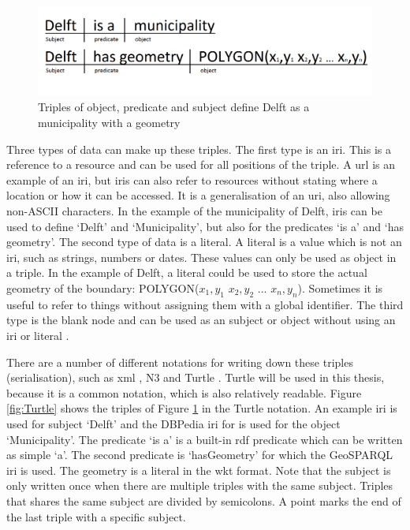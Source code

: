 \begin{figure}
	\includegraphics[width=0.7\linewidth]{figs/Triples.png}
	\caption{Triples of object, predicate and subject define Delft as a municipality with a geometry}
	\label{fig:Triples}
\end{figure}

Three types of data can make up these triples. The first type is an \ac{iri}. This is a reference to a resource and can be used for all positions of the triple. A \ac{url} is an example of an \ac{iri}, but \ac{iri}s can also refer to resources without stating where a location or how it can be accessed. It is a generalisation of an \ac{uri}, also allowing non-ASCII characters. In the example of the municipality of Delft, \ac{iri}s can be used to define `Delft' and `Municipality', but also for the predicates `is a' and `has geometry'. The second type of data is a literal. A literal is a value which is not an \ac{iri}, such as strings, numbers or dates. These values can only be used as object in a triple. In the example of Delft, a literal could be used to store the actual geometry of the boundary: POLYGON($x_{1},y_{1}$ $x_{2},y_{2}$ ... $x_{n},y_{n}$). Sometimes it is useful to refer to things without assigning them with a global identifier. The third type is the blank node and can be used as an subject or object without using an \ac{iri} or literal \citep{LD:W3C6}.  

There are a number of different notations for writing down these triples (serialisation), such as \ac{xml} \citep{LD:W3C3}, N3 \citep{LD:W3C5} and Turtle \citep{LD:W3C4}. Turtle will be used in this thesis, because it is a common notation, which is also relatively readable. Figure \ref{fig:Turtle} shows the triples of Figure \ref{fig:Triples} in the Turtle notation. An example \ac{iri} is used for subject `Delft' and the DBPedia \ac{iri} for is used for the object `Municipality'. The predicate `is a' is a built-in \ac{rdf} predicate which can be written as simple `a'. The second predicate is `hasGeometry' for which the GeoSPARQL \ac{iri} is used. The geometry is a literal in the \ac{wkt} format. Note that the subject is only written once when there are multiple triples with the same subject. Triples that shares the same subject are divided by semicolons. A point marks the end of the last triple with a specific subject.

